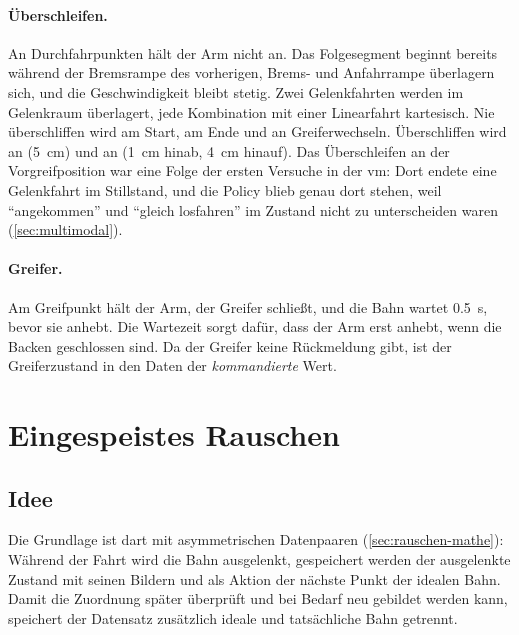\paragraph{Überschleifen.} An Durchfahrpunkten hält der Arm nicht an. Das Folgesegment
beginnt bereits während der Bremsrampe des vorherigen, Brems- und Anfahrrampe überlagern
sich, und die Geschwindigkeit bleibt stetig. Zwei Gelenkfahrten werden im Gelenkraum
überlagert, jede Kombination mit einer Linearfahrt kartesisch. Nie überschliffen wird am
Start, am Ende und an Greiferwechseln. Überschliffen wird an  (\SI{5}{\centi\metre}) und an 
(\SI{1}{\centi\metre} hinab, \SI{4}{\centi\metre} hinauf). Das Überschleifen an der
Vorgreifposition war eine Folge
der ersten Versuche in der \ac{vm}: Dort endete eine Gelenkfahrt im Stillstand, und die Policy
blieb genau dort stehen, weil \enquote{angekommen} und \enquote{gleich losfahren} im Zustand
nicht zu unterscheiden waren (\cref{sec:multimodal}).

\paragraph{Greifer.} Am Greifpunkt hält der Arm, der Greifer schließt, und die Bahn wartet
\SI{0.5}{\second}, bevor sie anhebt. Die Wartezeit sorgt dafür, dass der Arm erst anhebt, wenn
die Backen geschlossen sind. Da der Greifer keine Rückmeldung gibt, ist der Greiferzustand in
den Daten der \emph{kommandierte} Wert.


\section{Eingespeistes Rauschen}
\label{sec:noise-umsetzung}

\subsection{Idee}

Die Grundlage ist \ac{dart} mit asymmetrischen Datenpaaren (\cref{sec:rauschen-mathe}):
Während der Fahrt wird die Bahn ausgelenkt, gespeichert werden der ausgelenkte Zustand mit
seinen Bildern und als Aktion der nächste Punkt der idealen Bahn. Damit die Zuordnung später
überprüft und bei Bedarf neu gebildet werden kann, speichert der Datensatz zusätzlich ideale
und tatsächliche Bahn getrennt.


